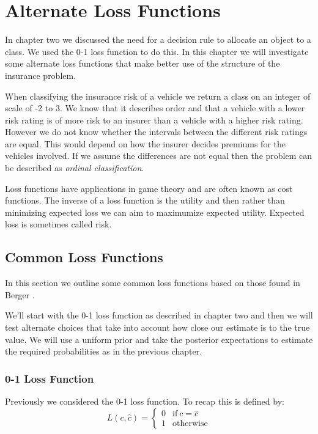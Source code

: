 \chapter{Alternate Loss Functions}

In chapter two we discussed the need for a decision rule to allocate an object to a class.
We used the 0-1 loss function to do this.
In this chapter we will investigate some alternate loss functions that make better use of the structure of the insurance problem.

When classifying the insurance risk of a vehicle we return a class on an integer of scale of -2 to 3.
We know that it describes order and that a vehicle with a lower risk rating is of more risk to an insurer than a vehicle with a higher risk rating.
However we do not know whether the intervals between the different risk ratings are equal.
This would depend on how the insurer decides premiums for the vehicles involved.
If we assume the differences are not equal then the problem can be described as \textit{ordinal classification}.

Loss functions have applications in game theory and are often known as cost functions.
The inverse of a loss function is the utility and then rather than minimizing expected loss we can aim to maximumize expected utility.
Expected loss is sometimes called risk.


\section{Common Loss Functions}

In this section we outline some common loss functions based on those found in Berger \cite{Berger85}.

We'll start with the 0-1 loss function as described in chapter two and then we will test alternate choices that take into account how close our estimate is to the true value.
We will use a uniform prior and take the posterior expectations to estimate the required probabilities as in the previous chapter.

\subsection{0-1 Loss Function}
Previously we considered the 0-1 loss function.
To recap this is defined by:
\begin{equation}
	L(c, \hat{c}) = 
	\begin{cases}
		0 & \text{if}\ c = \hat{c} \\
		1 & \text{otherwise}
	\end{cases}
\end{equation}

